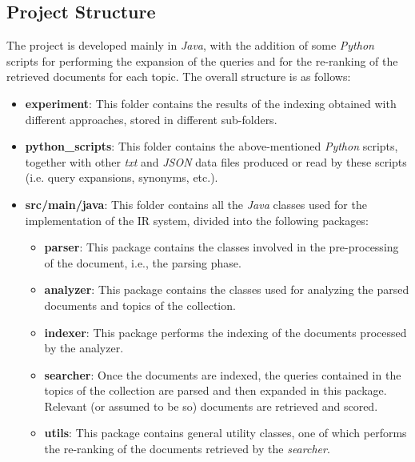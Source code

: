 \subsection{Project Structure}
The project is developed mainly in \textit{Java}, with the addition of some \textit{Python} scripts for performing the expansion of the queries and for the re-ranking of the retrieved documents for each topic. The overall structure is as follows:
\begin{itemize}
    \item \textbf{experiment}: This folder contains the results of the indexing obtained with different approaches, stored in different sub-folders.

    \item \textbf{python\_scripts}: This folder contains the above-mentioned \textit{Python} scripts, together with other \textit{txt} and \textit{JSON} data files produced or read by these scripts (i.e. query expansions, synonyms, etc.).

    \item \textbf{src/main/java}: This folder contains all the \textit{Java} classes used for the implementation of the \ac{IR} system, divided into the following packages:
    \begin{itemize}
        \item \textbf{parser}: This package contains the classes involved in the pre-processing of the document, i.e., the parsing phase.

        \item \textbf{analyzer}: This package contains the classes used for analyzing the parsed documents and topics of the collection.

        \item \textbf{indexer}: This package performs the indexing of the documents processed by the analyzer.

        \item \textbf{searcher}: Once the documents are indexed, the queries contained in the topics of the collection are parsed and then expanded in this package. Relevant (or assumed to be so) documents are retrieved and scored.

        \item \textbf{utils}: This package contains general utility classes, one of which performs the re-ranking of the documents retrieved by the \textit{searcher}.
    \end{itemize}
\end{itemize}


